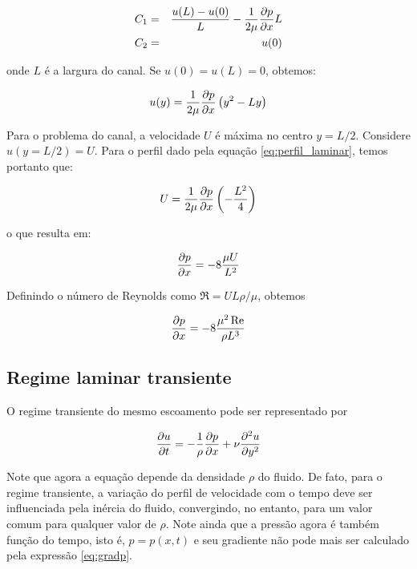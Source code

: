 \begin{eqnarray}
    C_1 &=& \frac{u(L)-u(0)}{L}-\frac{1}{2\mu}\frac{\partial p}{\partial x}L\\
    C_2 &=& u(0)
\end{eqnarray}

onde $L$ é a largura do canal. Se $u(0)=u(L)=0$, obtemos:

\begin{equation}
  u(y) = \frac{1}{2\mu}\frac{\partial p}{\partial x}\left(y^2-Ly\right)
  \label{eq:perfil_laminar}
\end{equation}

Para o problema do canal, a velocidade $U$ é máxima no centro $y=L/2$.
Considere $u(y=L/2)=U$. Para o perfil dado pela equação
\ref{eq:perfil_laminar}, temos portanto que:

\begin{equation}
  U = \frac{1}{2\mu}\frac{\partial p}{\partial x}\left(-\frac{L^2}{4}\right)
\end{equation}

o que resulta em:

\begin{equation}
  \frac{\partial p}{\partial x}=-8\frac{\mu U}{L^2}
\end{equation}

Definindo o número de Reynolds como $\Re=UL\rho/\mu$, obtemos

\begin{equation}
  \frac{\partial p}{\partial x}=-8\frac{\mu^2\operatorname{Re}}{\rho L^3}
  \label{eq:gradp}
\end{equation}

\subsection{Regime laminar transiente}

O regime transiente do mesmo escoamento pode ser representado por

\begin{equation}
    \frac{\partial u}{\partial t}=-\frac{1}{\rho}\frac{\partial p}{\partial x}+\nu\frac{\partial^2u}{\partial y^2}
    \label{eq:perfil_laminar_transiente}
\end{equation}

Note que agora a equação depende da densidade $\rho$ do fluido. De fato, para o regime transiente, a variação do perfil de velocidade com o tempo deve ser influenciada pela inércia do fluido, convergindo, no entanto, para um valor comum para qualquer valor de $\rho$. Note ainda que a pressão agora é também função do tempo, isto é, $p = p(x,t)$ e seu gradiente não pode mais ser calculado pela expressão \ref{eq:gradp}.

